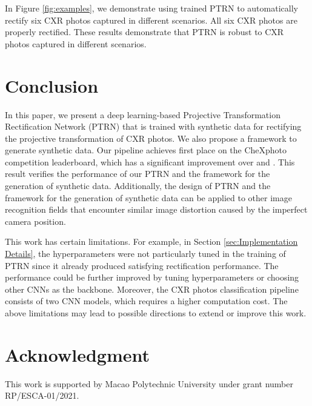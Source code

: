 \documentclass[preprint, 12pt]{elsarticle}
\begin{document}
In Figure \ref{fig:examples}, we demonstrate using trained PTRN to automatically rectify six CXR photos captured in different scenarios. All six CXR photos are properly rectified. These results demonstrate that PTRN is robust to CXR photos captured in different scenarios.

\section{Conclusion} \label{sec:Conclusion}

In this paper, we present a deep learning-based Projective Transformation Rectification Network (PTRN) that is trained with synthetic data for rectifying the projective transformation of CXR photos. We also propose a framework to generate synthetic data. Our pipeline achieves first place on the CheXphoto competition leaderboard, which has a significant improvement over \cite{le2020interpretation} and \cite{chong2021gan}. This result verifies the performance of our PTRN and the framework for the generation of synthetic data. Additionally, the design of PTRN and the framework for the generation of synthetic data can be applied to other image recognition fields that encounter similar image distortion caused by the imperfect camera position.

This work has certain limitations. For example, in Section \ref{sec:Implementation Details}, the hyperparameters were not particularly tuned in the training of PTRN since it already produced satisfying rectification performance. The performance could be further improved by tuning hyperparameters or choosing other CNNs as the backbone. Moreover, the CXR photos classification pipeline consists of two CNN models, which requires a higher computation cost. The above limitations may lead to possible directions to extend or improve this work.

\section*{Acknowledgment}

This work is supported by Macao Polytechnic University under grant number RP/ESCA-01/2021.











\end{document}
